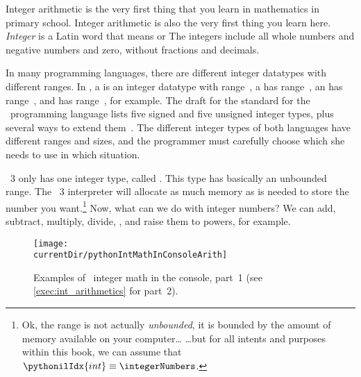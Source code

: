 %
\label{sec:int}%
%
Integer arithmetic is the very first thing that you learn in mathematics in primary school.
Integer arithmetic is also the very first thing you learn here.
\emph{Integer} is a Latin word that means  or 
The integers include all whole numbers and negative numbers and zero, without fractions and decimals.

In many programming languages, there are different integer datatypes with different ranges.
In , a  is an integer datatype with range~, a  has range~, an  has range~, and  has range~, for example.
The draft for the  standard for the ~programming language lists five signed and five unsigned integer types, plus several ways to extend them~\cite{ISOIEC98892017PLCWDOS}.
The different integer types of both languages have different ranges and sizes, and the programmer must carefully choose which she needs to use in which situation.

\python~3 only has one integer type, called .
This type has basically an unbounded range.
The \python~3 interpreter will allocate as much memory as is needed to store the number you want.\footnote{%
Ok, the range is not actually \emph{unbounded}, it is bounded by the amount of memory available on your computer{\dots} {\dots}but for all intents and purposes within this book, we can assume that~$\pythonilIdx{int}\equiv\integerNumbers$.}%
%
%
\label{sec:int:integerArithmetics}%
Now, what can we do with integer numbers?
We can add, subtract, multiply, divide, , and raise them to powers, for example.

\begin{figure}%
\centering%
\texttt{[image: \\currentDir/pythonIntMathInConsoleArith]}%
\caption{Examples of \python\ integer math in the console, part~1 (see \cref{exec:int_arithmetics} for part~2).}%
\label{fig:pythonIntMathInConsoleArith}%
\end{figure}%
%
%
%

